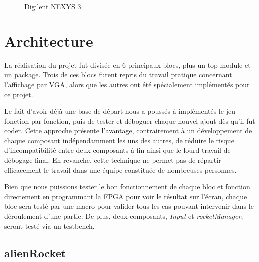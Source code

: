 \documentclass[french]{nakrule}
\begin{document}
\begin{figure}[h]
  \caption{Digilent NEXYS 3}
  \label{motherboard}
\end{figure}



\asymmetricalPage
\chapter{Architecture}
\label{architecture}

La réalisation du projet fut divisée en 6 principaux blocs, plus un top module et
un package. Trois de ces blocs furent repris du travail pratique concernant
l'affichage par VGA, alors que les autres ont été spécialement implémentés pour
ce projet.

Le fait d'avoir déjà une base de départ nous a poussés à implémentés le jeu
fonction par fonction, puis de tester et déboguer chaque nouvel ajout dès qu'il
fut coder. Cette approche présente l'avantage, contrairement à un développement
de chaque composant indépendamment les uns des autres, de réduire le risque
d'incompatibilité entre deux composants à fin ainsi que le lourd travail de
débogage final. En revanche, cette technique ne permet pas de répartir
efficacement le travail dans une équipe constituée de nombreuses personnes.

Bien que nous puissions tester le bon fonctionnement de chaque bloc et fonction
directement en programmant la FPGA pour voir le résultat sur l'écran, chaque
bloc sera testé par une macro pour valider tous les cas pouvant intervenir dans
le déroulement d'une partie. De plus, deux composants, \emph{Input} et
\emph{rocketManager}, seront testé via un testbench.

\symmetricalPage

\section{alienRocket}
\label{sec:alienRocket}
\end{document}
